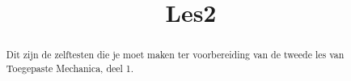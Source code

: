 \documentclass{ximera}
\title{Les2}
\begin{document}
\begin{abstract}
Dit zijn de zelftesten die je moet maken ter voorbereiding van de tweede les van Toegepaste Mechanica, deel 1.
\end{abstract}
\maketitle
\end{document}
